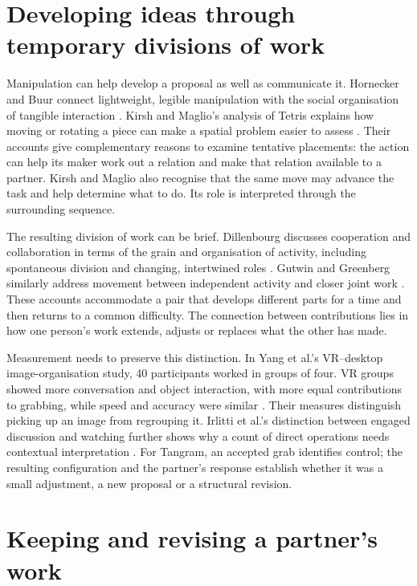 \section{Developing ideas through temporary divisions of work}\label{sec:2-4}

Manipulation can help develop a proposal as well as communicate it. Hornecker and Buur connect lightweight, legible manipulation with the social organisation of tangible interaction \cite{hornecker2006}. Kirsh and Maglio's analysis of Tetris explains how moving or rotating a piece can make a spatial problem easier to assess \cite{kirsh1994}. Their accounts give complementary reasons to examine tentative placements: the action can help its maker work out a relation and make that relation available to a partner. Kirsh and Maglio also recognise that the same move may advance the task and help determine what to do. Its role is interpreted through the surrounding sequence.

The resulting division of work can be brief. Dillenbourg discusses cooperation and collaboration in terms of the grain and organisation of activity, including spontaneous division and changing, intertwined roles \cite{dillenbourg1999}. Gutwin and Greenberg similarly address movement between independent activity and closer joint work \cite{gutwin2002}. These accounts accommodate a pair that develops different parts for a time and then returns to a common difficulty. The connection between contributions lies in how one person's work extends, adjusts or replaces what the other has made.

Measurement needs to preserve this distinction. In Yang et al.'s VR--desktop image-organisation study, 40 participants worked in groups of four. VR groups showed more conversation and object interaction, with more equal contributions to grabbing, while speed and accuracy were similar \cite{yang2022}. Their measures distinguish picking up an image from regrouping it. Irlitti et al.'s distinction between engaged discussion and watching further shows why a count of direct operations needs contextual interpretation \cite{irlitti2024}. For Tangram, an accepted grab identifies control; the resulting configuration and the partner's response establish whether it was a small adjustment, a new proposal or a structural revision.

\section{Keeping and revising a partner's work}\label{sec:2-5}

